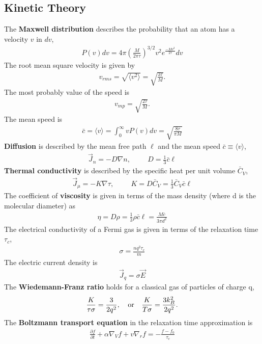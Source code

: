 \begin{multicols}{2}
	\subsection{Kinetic Theory}
	The \textbf{Maxwell distribution} describes the probability that an atom has a velocity $v$ in $dv$,
	\begin{align}
		P(v)dv = 4\pi\left(\frac{M}{2\pi\tau}\right)^{3/2}v^2e^{\frac{-Mv^2}{2\tau}}dv
	\end{align}
	The root mean square velocity is given by
	\begin{align}
		v_{rms} = \sqrt{\langle v^2 \rangle} = \sqrt{\frac{3\tau}{M}}.
	\end{align}
	The most probably value of the speed is
	\begin{align}
		v_{mp} = \sqrt{\frac{2\tau}{M}}.
	\end{align}
	The mean speed is
	\begin{align}
		\bar{c} = \langle v \rangle = \int_0^\infty v P(v) dv = \sqrt{\frac{8\tau}{\pi M}}
	\end{align}
	\textbf{Diffusion} is described by the mean free path $\ell$ and the mean speed $\bar{c}\equiv \langle v \rangle$,
	\begin{align}
		\vec{J}_n=-D\nabla n, \hspace{1cm} D = \frac{1}{3}\bar{c}\ell
	\end{align}
	\textbf{Thermal conductivity} is described by the specific heat per unit volume $\bar{C}_V$,
	\begin{align}
		\vec{J}_\mu = -K \nabla \tau, \hspace{1cm} K = D\bar{C}_V =  \frac{1}{3}\bar{C}_V \bar{c}\ell
	\end{align}
	The coefficient of \textbf{viscosity} is given in terms of the mass density (where d is the molecular diameter) as
	\begin{align}
		\eta = D\rho = \frac{1}{3}\rho \bar{c} \ell = \frac{M\bar{c}}{3\pi d^2}
	\end{align}
	The electrical conductivity of a Fermi gas is given in terms of the relaxation time $\tau_c$,
	\begin{align}
		\sigma = \frac{nq^2\tau_c}{m}
	\end{align} 
	The electric current density is
	\begin{align}
		\vec{J}_q = \sigma\vec{E}
	\end{align}
	The \textbf{Wiedemann-Franz ratio} holds for a classical gas of particles of charge q,
	\begin{align}
		\frac{K}{\tau \sigma}=\frac{3}{2q^2},\hspace{0.25cm} \textrm{ or }\hspace{0.25cm} \frac{K}{T\sigma} = \frac{3k_B^2}{2q^2}.
	\end{align}
	The \textbf{Boltzmann transport equation} in the relaxation time approximation is
	\begin{align}
		\frac{\partial f}{\partial t} + \alpha \nabla_V f+v\nabla_r f=-\frac{f-f_0}{\tau_c} 
	\end{align}
\end{multicols}
